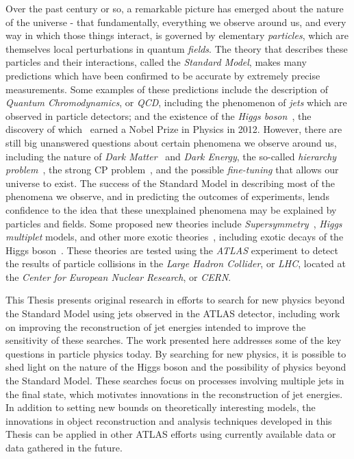 Over the past century or so, a remarkable picture has emerged about the nature of the universe - that fundamentally, everything we observe around us, and every way in which those things interact, is governed by elementary \textit{particles}, which are themselves local perturbations in quantum \textit{fields}.
The theory that describes these particles and their interactions, called the \textit{Standard Model}, makes many predictions which have been confirmed to be accurate by extremely precise measurements.
Some examples of these predictions include the description of \textit{Quantum Chromodynamics}\cite{ref:TODO}, or \textit{QCD}, including the phenomenon of \textit{jets}\cite{ref:TODO} which are observed in particle detectors; and the existence of the \textit{Higgs boson}~\cite{Englert:1964et,Higgs:1964pj,Higgs:1964ia,Guralnik:1964eu}, the discovery of which~\cite{HIGG-2012-27,CMS-HIG-12-028} earned a Nobel Prize in Physics in 2012\cite{ref:TODO}.
However, there are still big unanswered questions about certain phenomena we observe around us, including the nature of \textit{Dark Matter}~\cite{Trimble:1987ee} and \textit{Dark Energy}\cite{ref:TODO}, the so-called \textit{hierarchy problem}~\cite{Nilles:1982dy}, the strong CP problem~\cite{Peccei:1977hh}, and the possible \textit{fine-tuning}\cite{ref:TODO} that allows our universe to exist.
The success of the Standard Model in describing most of the phenomena we observe, and in predicting the outcomes of experiments, lends confidence to the idea that these unexplained phenomena may be explained by particles and fields.
Some proposed new theories include \textit{Supersymmetry}~\cite{ref:TODO,Dobrescu:2000yn,Ellwanger:2003jt,Dermisek:2005ar,Chang:2008cw,Morrissey:2008gm}, \textit{Higgs multiplet} models\cite{ref:TODO}, and other more exotic theories~\cite{ref:TODO}, including exotic decays of the Higgs boson~\cite{Curtin:2013fra}. %
These theories are tested using the \textit{ATLAS} experiment\cite{PERF-2007-01} to detect the results of particle collisions in the \textit{Large Hadron Collider}, or \textit{LHC}, located at the \textit{Center for European Nuclear Research}, or \textit{CERN}.

This Thesis presents original research in efforts to search for new physics beyond the Standard Model using jets observed in the ATLAS detector, including work on improving the reconstruction of jet energies intended to improve the sensitivity of these searches.
The work presented here addresses some of the key questions in particle physics today.
By searching for new physics, it is possible to shed light on the nature of the Higgs boson and the possibility of physics beyond the Standard Model. 
These searches focus on processes involving multiple jets in the final state, which motivates innovations in the reconstruction of jet energies.
In addition to setting new bounds on theoretically interesting models,
the innovations in object reconstruction and analysis techniques developed in this Thesis can be applied in other ATLAS efforts using currently available data or data gathered in the future.

